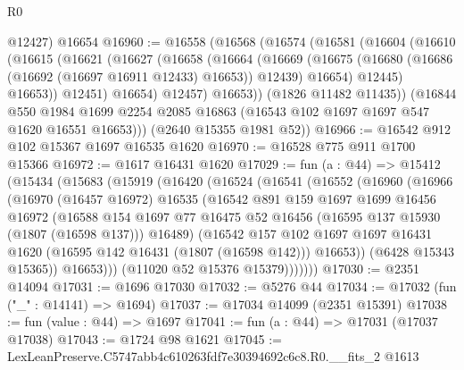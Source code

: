 \begin{lexlean}{R0}
\begin{coremodule}
      @12427)
    @16654
@16960 := @16558
    (@16568
      (@16574
        (@16581
          (@16604
            (@16610
              (@16615
                (@16621
                  (@16627
                    (@16658
                      (@16664
                        (@16669
                          (@16675
                            (@16680 (@16686 (@16692 (@16697 @16911 @12433) @16653)) @12439)
                            @16654)
                          @12445)
                        @16653))
                    @12451)
                  @16654)
                @12457)
              @16653))
          (@1826 @11482 @11435))
        (@16844
          @550
          @1984
          @1699
          @2254
          @2085
          @16863
          (@16543 @102 @1697 @1697 @547 @1620 @16551 @16653)))
      (@2640 @15355 @1981 @52))
@16966 := @16542 @912 @102 @15367 @1697 @16535 @1620
@16970 := @16528 @775 @911 @1700 @15366
@16972 := @1617 @16431 @1620
@17029 := fun (a : @44) =>
  @15412
    (@15434
      (@15683
        (@15919
          (@16420
            (@16524
              (@16541
                (@16552
                  (@16960
                    (@16966
                      (@16970
                        (@16457 @16972)
                        @16535
                        (@16542
                          @891
                          @159
                          @1697
                          @1699
                          @16456
                          @16972
                          (@16588
                            @154
                            @1697
                            @77
                            @16475
                            @52
                            @16456
                            (@16595 @137 @15930 (@1807 (@16598 @137)))
                            @16489)
                          (@16542
                            @157
                            @102
                            @1697
                            @1697
                            @16431
                            @1620
                            (@16595 @142 @16431 (@1807 (@16598 @142)))
                            @16653))
                        (@6428 @15343 @15365))
                      @16653)))
                (@11020 @52 @15376 @15379)))))))
@17030 := @2351 @14094
@17031 := @1696 @17030
@17032 := @5276 @44
@17034 := @17032 (fun ("_" : @14141) => @1694)
@17037 := @17034 @14099 (@2351 @15391)
@17038 := fun (value : @44) => @1697
@17041 := fun (a : @44) => @17031 (@17037 @17038)
@17043 := @1724 @98 @1621
@17045 := LexLeanPreserve.C5747abb4c610263fdf7e30394692c6c8.R0.__fits_2 @1613

\end{coremodule}
\end{lexlean}
